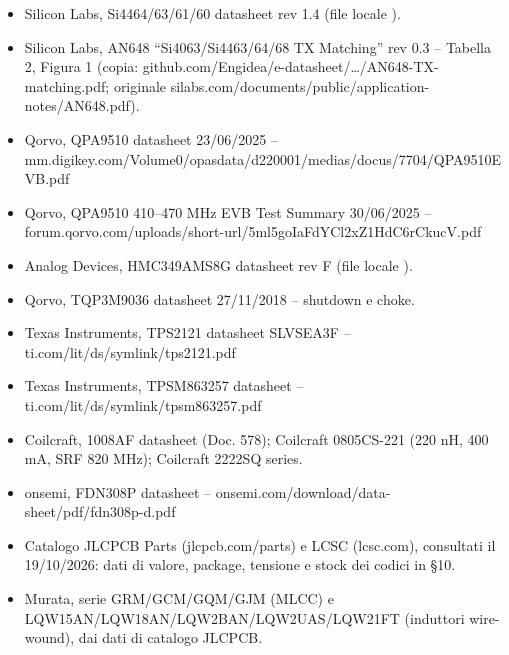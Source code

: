 \begin{itemize}
\item Silicon Labs, Si4464/\allowbreak{}63/\allowbreak{}61/\allowbreak{}60 datasheet rev 1.4 (file locale ).
\item Silicon Labs, AN648 \textquotedblleft{}Si4063/\allowbreak{}Si4463/\allowbreak{}64/\allowbreak{}68 TX Matching\textquotedblright{} rev 0.3 – Tabella 2, Figura 1 (copia: github.com/\allowbreak{}Engidea/\allowbreak{}e-datasheet/\allowbreak{}…/\allowbreak{}AN648-TX-matching.pdf; originale silabs.com/\allowbreak{}documents/\allowbreak{}public/\allowbreak{}application-notes/\allowbreak{}AN648.pdf).
\item Qorvo, QPA9510 datasheet 23/\allowbreak{}06/\allowbreak{}2025 – mm.digikey.com/\allowbreak{}Volume0/\allowbreak{}opasdata/\allowbreak{}d220001/\allowbreak{}medias/\allowbreak{}docus/\allowbreak{}7704/\allowbreak{}QPA9510EVB.pdf
\item Qorvo, QPA9510 410–470 MHz EVB Test Summary 30/\allowbreak{}06/\allowbreak{}2025 – forum.qorvo.com/\allowbreak{}uploads/\allowbreak{}short-url/\allowbreak{}5ml5goIaFdYCl2xZ1HdC6rCkucV.pdf
\item Analog Devices, HMC349AMS8G datasheet rev F (file locale ).
\item Qorvo, TQP3M9036 datasheet 27/\allowbreak{}11/\allowbreak{}2018 – shutdown e choke.
\item Texas Instruments, TPS2121 datasheet SLVSEA3F – ti.com/\allowbreak{}lit/\allowbreak{}ds/\allowbreak{}symlink/\allowbreak{}tps2121.pdf
\item Texas Instruments, TPSM863257 datasheet – ti.com/\allowbreak{}lit/\allowbreak{}ds/\allowbreak{}symlink/\allowbreak{}tpsm863257.pdf
\item Coilcraft, 1008AF datasheet (Doc. 578); Coilcraft 0805CS-221 (220 nH, 400 mA, SRF 820 MHz); Coilcraft 2222SQ series.
\item onsemi, FDN308P datasheet – onsemi.com/\allowbreak{}download/\allowbreak{}data-sheet/\allowbreak{}pdf/\allowbreak{}fdn308p-d.pdf
\item Catalogo JLCPCB Parts (jlcpcb.com/\allowbreak{}parts) e LCSC (lcsc.com), consultati il 19/\allowbreak{}10/\allowbreak{}2026: dati di valore, package, tensione e stock dei codici in §10.
\item Murata, serie GRM/\allowbreak{}GCM/\allowbreak{}GQM/\allowbreak{}GJM (MLCC) e LQW15AN/\allowbreak{}LQW18AN/\allowbreak{}LQW2BAN/\allowbreak{}LQW2UAS/\allowbreak{}LQW21FT (induttori wire-wound), dai dati di catalogo JLCPCB.
\end{itemize}
